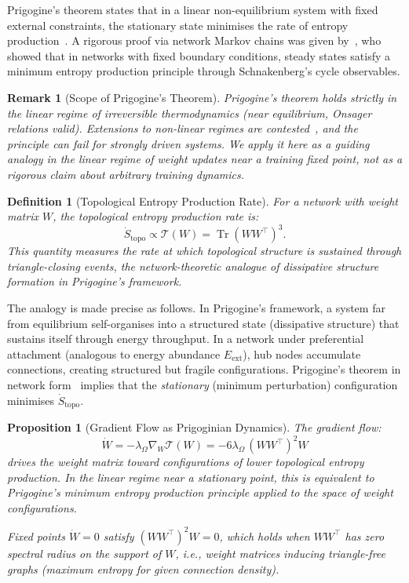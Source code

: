 \documentclass[11pt,a4paper]{article}
\newtheorem{proposition}{Proposition}
\newtheorem{definition}{Definition}
\newtheorem{remark}{Remark}
\begin{document}
Prigogine's theorem states that in a linear non-equilibrium system
with fixed external constraints, the stationary state minimises the
rate of entropy production~\cite{prigogine1967,klein1954}. A rigorous
proof via network Markov chains was given by~\cite{schnakenberg_nets},
who showed that in networks with fixed boundary conditions, steady
states satisfy a minimum entropy production principle through
Schnakenberg's cycle observables.

\begin{remark}[Scope of Prigogine's Theorem]
Prigogine's theorem holds strictly in the \emph{linear} regime of
irreversible thermodynamics (near equilibrium, Onsager relations
valid). Extensions to non-linear regimes are contested~\cite{prigogine_critical},
and the principle can fail for strongly driven systems. We apply it
here as a \emph{guiding analogy} in the linear regime of weight
updates near a training fixed point, not as a rigorous claim about
arbitrary training dynamics.
\end{remark}

\begin{definition}[Topological Entropy Production Rate]
\label{def:tep}
For a network with weight matrix $W$, the topological entropy production
rate is:
\begin{equation}
\dot{S}_{\mathrm{topo}} \propto \mathcal{T}(W) =
\operatorname{Tr}(WW^\top)^3.
\label{eq:entropy_prod}
\end{equation}
This quantity measures the rate at which topological structure is
sustained through triangle-closing events, the network-theoretic
analogue of dissipative structure formation in Prigogine's framework.
\end{definition}

The analogy is made precise as follows. In Prigogine's framework,
a system far from equilibrium self-organises into a structured state
(dissipative structure) that sustains itself through energy throughput.
In a network under preferential attachment (analogous to energy
abundance $E_\text{ext}$), hub nodes accumulate connections, creating
structured but fragile configurations. Prigogine's theorem in network
form~\cite{schnakenberg_nets} implies that the \emph{stationary}
(minimum perturbation) configuration minimises $\dot{S}_\text{topo}$.

\begin{proposition}[Gradient Flow as Prigoginian Dynamics]
\label{prop:gradient_flow}
The gradient flow:
\begin{equation}
\dot{W} = -\lambda_\Omega \nabla_W \mathcal{T}(W)
= -6\lambda_\Omega \, (WW^\top)^2 W
\label{eq:gradient_flow}
\end{equation}
drives the weight matrix toward configurations of lower topological
entropy production. In the linear regime near a stationary point,
this is equivalent to Prigogine's minimum entropy production principle
applied to the space of weight configurations.

Fixed points $\dot{W} = 0$ satisfy $(WW^\top)^2 W = 0$, which holds
when $WW^\top$ has zero spectral radius on the support of $W$,
i.e., weight matrices inducing triangle-free graphs (maximum entropy
for given connection density).
\end{proposition}
\end{document}
